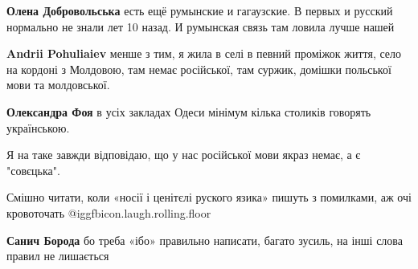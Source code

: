 \begin{itemize}
\begin{itemize}
\textbf{Олена Добровольська} есть ещё румынские и гагаузские. В первых и русский нормально не знали лет 10 назад. И румынская связь там ловила лучше нашей

 
\textbf{Andrii Pohuliaiev} менше з тим, я жила в селі в певний проміжок життя, село на кордоні з Молдовою, там немає російської, там суржик, домішки польської мови та молдовської.

 
\textbf{Олександра Фоя} в усіх закладах Одеси мінімум кілька столиків говорять українською.
\end{itemize}

 
Я на таке завжди відповідаю, що у нас російської мови якраз немає, а є "совєцька".

 
Смішно читати, коли «носії і ценітєлі руского язика» пишуть з помилками, аж очі кровоточать  @igg{fbicon.laugh.rolling.floor} 

\begin{itemize}
 
\textbf{Санич Борода} бо треба «ібо» правильно написати, багато зусиль, на інші слова правил не лишається
\end{itemize}


\end{itemize}
